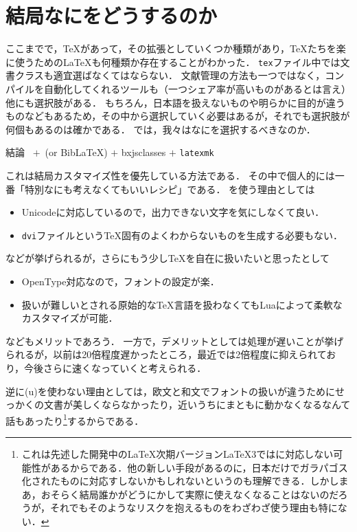 \documentclass[./main]{subfiles}
\begin{document}
\clearpage
\section{結局なにをどうするのか}
\noindent
ここまでで，\TeX があって，その拡張としていくつか種類があり，\TeX たちを楽に使うための\LaTeX も何種類か存在することがわかった．
\verb|tex|ファイル中では文書クラスも適宜選ばなくてはならない．
文献管理の方法も一つではなく，コンパイルを自動化してくれるツールも（一つシェア率が高いものがあるとは言え）他にも選択肢がある．
もちろん，日本語を扱えないものや明らかに目的が違うものなどもあるため，その中から選択していく必要はあるが，それでも選択肢が何個もあるのは確かである．
では，我々はなにを選択するべきなのか．
\begin{center}
  \begin{minipage}{0.7\linewidth}
    \centering
    \begin{itembox}{結論}
      \centering
      \LuaLaTeX\ $+$ \upBibTeX\,(or Bib\LaTeX) $+$ bxjsclasses $+$ \verb|latexmk| 
    \end{itembox}  
  \end{minipage}\hfill
\end{center}

\noindent これは結局カスタマイズ性を優先している方法である．
その中で個人的には一番「特別なにも考えなくてもいいレシピ」である．
\LuaLaTeX を使う理由としては
\begin{itemize}
  \item Unicodeに対応しているので，出力できない文字を気にしなくて良い．
  \item \verb|dvi|ファイルという\TeX 固有のよくわからないものを生成する必要もない．
\end{itemize}
などが挙げられるが，さらにもう少し\TeX を自在に扱いたいと思ったとして
\begin{itemize}
  \item OpenType対応なので，フォントの設定が楽．
  \item 扱いが難しいとされる原始的な\TeX 言語を扱わなくてもLuaによって柔軟なカスタマイズが可能．
\end{itemize}
などもメリットであろう\supercite{JPLaTeX_Yato}．
一方で，デメリットとして\LuaLaTeX は処理が遅いことが挙げられるが，以前は20倍程度遅かったところ，最近では2倍程度に抑えられており\supercite{LuaTeX_notslow}，今後さらに速くなっていくと考えられる．

逆に(u)\pLaTeX を使わない理由としては，欧文と和文でフォントの扱いが違うためにせっかくの文書が美しくならなかったり，近いうちにまともに動かなくなるなんて話もあったり\supercite{pLaTeX_danger,pLaTeX_pinch}\footnote{これは先述した開発中の\LaTeX 次期バージョン\LaTeX3では\pTeX に対応しない可能性があるからである．他の新しい手段があるのに，日本だけでガラパゴス化されたものに対応すしないかもしれないというのも理解できる．しかしまあ，おそらく結局誰かがどうにかして実際に使えなくなることはないのだろうが，それでもそのようなリスクを抱えるものをわざわざ使う理由も特にない．}するからである．
\end{document}

